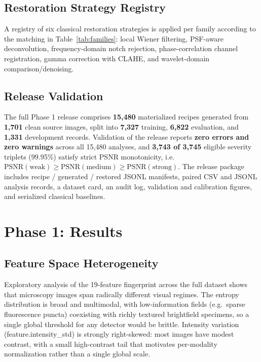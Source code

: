 \documentclass[11pt]{article}
\begin{document}
\subsection{Restoration Strategy Registry}

A registry of six classical restoration strategies is applied per family according to
the matching in Table~\ref{tab:families}: local Wiener filtering, PSF-aware
deconvolution, frequency-domain notch rejection, phase-correlation channel
registration, gamma correction with CLAHE, and wavelet-domain comparison/denoising.

\subsection{Release Validation}

The full Phase 1 release comprises \textbf{15{,}480} materialized recipes generated
from \textbf{1{,}701} clean source images, split into \textbf{7{,}327} training,
\textbf{6{,}822} evaluation, and \textbf{1{,}331} development records. Validation of the
release reports \textbf{zero errors and zero warnings} across all 15{,}480 analyses,
and \textbf{3{,}743 of 3{,}745} eligible severity triplets (99.95\%) satisfy strict PSNR
monotonicity, i.e.\ $\mathrm{PSNR}(\text{weak}) \geq \mathrm{PSNR}(\text{medium}) \geq
\mathrm{PSNR}(\text{strong})$. The release package includes recipe / generated /
restored JSONL manifests, paired CSV and JSONL analysis records, a dataset card, an
audit log, validation and calibration figures, and serialized classical baselines.

\section{Phase 1: Results}

\subsection{Feature Space Heterogeneity}

Exploratory analysis of the 19-feature fingerprint across the full dataset shows that
microscopy images span radically different visual regimes. The entropy distribution is
broad and multimodal, with low-information fields (e.g.\ sparse fluorescence puncta)
coexisting with richly textured brightfield specimens, so a single global threshold for
any detector would be brittle. Intensity variation (feature.intensity\_std) is strongly
right-skewed: most images have modest contrast, with a small high-contrast tail that
motivates per-modality normalization rather than a single global scale.
\end{document}
